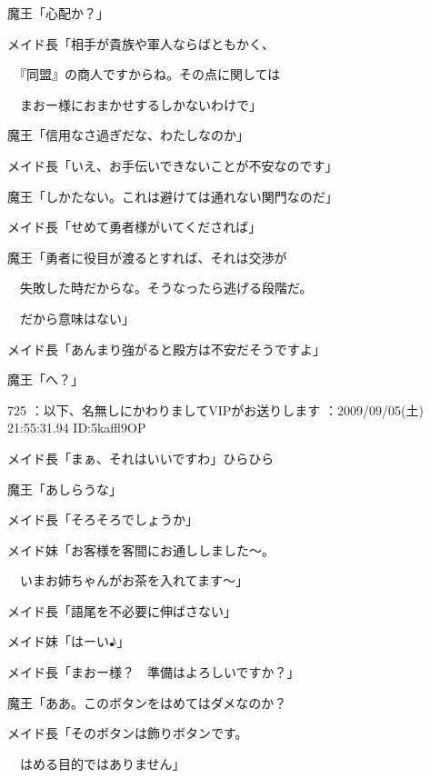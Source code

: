 \documentclass[a4j,twocolumn]{tarticle}
\begin{document}
魔王「心配か？」 



メイド長「相手が貴族や軍人ならばともかく、\par{} 
　『同盟』の商人ですからね。その点に関しては\par{} 
　まおー様におまかせするしかないわけで」 



魔王「信用なさ過ぎだな、わたしなのか」\par{} 
メイド長「いえ、お手伝いできないことが不安なのです」 



魔王「しかたない。これは避けては通れない関門なのだ」\par{} 
メイド長「せめて勇者様がいてくだされば」 



魔王「勇者に役目が渡るとすれば、それは交渉が\par{} 
　失敗した時だからな。そうなったら逃げる段階だ。\par{} 
　だから意味はない」 



メイド長「あんまり強がると殿方は不安だそうですよ」 



魔王「へ？」

	
    
    

725 ：以下、名無しにかわりましてVIPがお送りします ：2009/09/05(土) 21:55:31.94 ID:5kaffl9OP 


メイド長「まぁ、それはいいですわ」ひらひら\par{} 
魔王「あしらうな」 



メイド長「そろそろでしょうか」 



メイド妹「お客様を客間にお通ししました～。\par{} 
　いまお姉ちゃんがお茶を入れてます～」 



メイド長「語尾を不必要に伸ばさない」\par{} 
メイド妹「はーい♪」 



メイド長「まおー様？　準備はよろしいですか？」\par{} 
魔王「ああ。このボタンをはめてはダメなのか？ 



メイド長「そのボタンは飾りボタンです。\par{} 
　はめる目的ではありません」 
\end{document}
